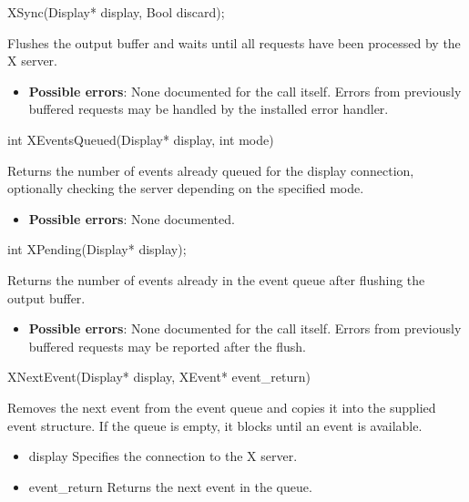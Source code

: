\documentclass{report}
\begin{document}
\begin{itemize}
        \begin{cppcode}
            XSync(Display* display, Bool discard);
        \end{cppcode}
        \bigbreak \noindent
        Flushes the output buffer and waits until all requests have been processed by the X server.

        \begin{itemize}
            \item \textbf{Possible errors}: None documented for the call itself. Errors from previously buffered requests may be handled by the installed error handler.
        \end{itemize}

        \begin{cppcode}
            int XEventsQueued(Display* display, int mode)
        \end{cppcode}
        \bigbreak \noindent
        Returns the number of events already queued for the display connection, optionally checking the server depending on the specified mode.

        \begin{itemize}
            \item \textbf{Possible errors}: None documented.
        \end{itemize}

        \begin{cppcode}
            int XPending(Display* display);
        \end{cppcode}
        \bigbreak \noindent
        Returns the number of events already in the event queue after flushing the output buffer.

        \begin{itemize}
            \item \textbf{Possible errors}: None documented for the call itself. Errors from previously buffered requests may be reported after the flush.
        \end{itemize}

        \begin{cppcode}
            XNextEvent(Display* display, XEvent* event_return)
        \end{cppcode}
        \bigbreak \noindent
        Removes the next event from the event queue and copies it into the supplied event structure. If the queue is empty, it blocks until an event is available.

        \begin{itemize}
            \item display Specifies the connection to the X server.
            \item event\_return Returns the next event in the queue.
        \end{itemize}


\end{itemize}
\end{document}
